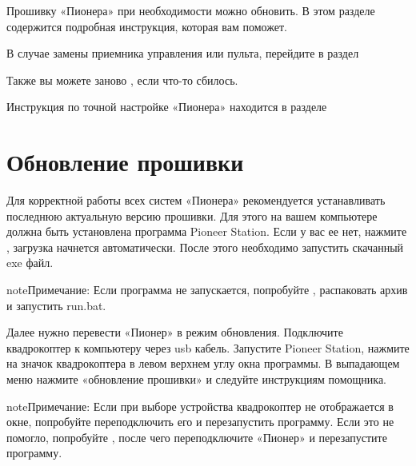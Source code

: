 \documentclass[a4paper,10pt,russian]{sphinxmanual}
\begin{document}
Прошивку «Пионера» при необходимости можно обновить. В этом разделе содержится подробная инструкция, которая вам поможет.

В случае замены приемника управления или пульта, перейдите в раздел {\hyperref[\detokenize{settings/rc_connection::doc}]{}}

Также вы можете заново , если что-то сбилось.

Инструкция по точной настройке «Пионера» находится в разделе {\hyperref[\detokenize{settings/autopilot_parameters::doc}]{}}


\section{Обновление прошивки}
\label{\detokenize{settings/firmware_upgrade:id1}}\label{\detokenize{settings/firmware_upgrade::doc}}
Для корректной работы всех систем «Пионера» рекомендуется устанавливать последнюю актуальную версию прошивки. Для этого на вашем компьютере должна быть установлена программа Pioneer Station. Если у вас ее нет, нажмите , загрузка начнется автоматически. После этого необходимо запустить скачанный exe файл.

\begin{sphinxadmonition}{note}{Примечание:}
Если программа не запускается, попробуйте , распаковать архив и запустить run.bat.
\end{sphinxadmonition}

Далее нужно перевести «Пионер» в режим обновления. Подключите квадрокоптер к компьютеру через usb кабель.
Запустите Pioneer Station, нажмите на значок квадрокоптера в левом верхнем углу окна программы. В выпадающем меню нажмите «обновление прошивки» и следуйте инструкциям помощника.

\begin{sphinxadmonition}{note}{Примечание:}
Если при выборе устройства квадрокоптер не отображается в окне, попробуйте переподключить его и перезапустить программу. Если это не помогло, попробуйте , после чего переподключите «Пионер» и перезапустите программу.
\end{sphinxadmonition}
\end{document}
